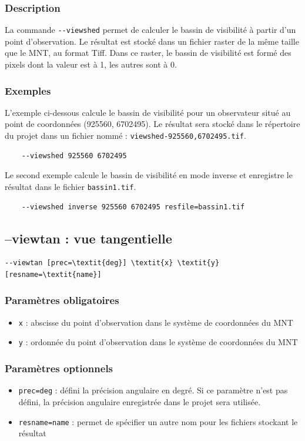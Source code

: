 \documentclass{report}
\begin{document}
\subsubsection{Description}
La commande \verb|--viewshed| permet de calculer le bassin de visibilité à partir d'un point d'observation. Le résultat est stocké dans un fichier raster de la même taille que le MNT, au format Tiff. Dans ce raster, le bassin de visibilité est formé des pixels dont la valeur est à 1, les autres sont à 0.

\subsubsection{Exemples}
L'exemple ci-dessous calcule le bassin de visibilité pour un observateur situé au point de coordonnées (925560, 6702495). Le résultat sera stocké dans le répertoire du projet dans un fichier nommé : \verb|viewshed-925560,6702495.tif|.
\begin{Verbatim}
	--viewshed 925560 6702495
\end{Verbatim}

Le second exemple calcule le bassin de visibilité en mode inverse et enregistre le résultat dans le fichier \verb|bassin1.tif|.
\begin{Verbatim}
	--viewshed inverse 925560 6702495 resfile=bassin1.tif
\end{Verbatim}

\subsection{--viewtan : vue tangentielle}
\begin{Verbatim}[commandchars=\\\{\}]
--viewtan [prec=\textit{deg}] \textit{x} \textit{y} [resname=\textit{name}]
\end{Verbatim}

\subsubsection{Paramètres obligatoires}
\begin{itemize}
	\item \verb|x| : abscisse du point d'observation dans le système de coordonnées du MNT
	\item \verb|y| : ordonnée du point d'observation dans le système de coordonnées du MNT
\end{itemize}

\subsubsection{Paramètres optionnels}
\begin{itemize}
	\item \verb|prec=deg| : défini la précision angulaire en degré. Si ce paramètre n'est pas défini, la précision angulaire enregistrée dans le projet sera utilisée.
	\item \verb|resname=name| : permet de spécifier un autre nom pour les fichiers stockant le résultat
\end{itemize}
\end{document}
